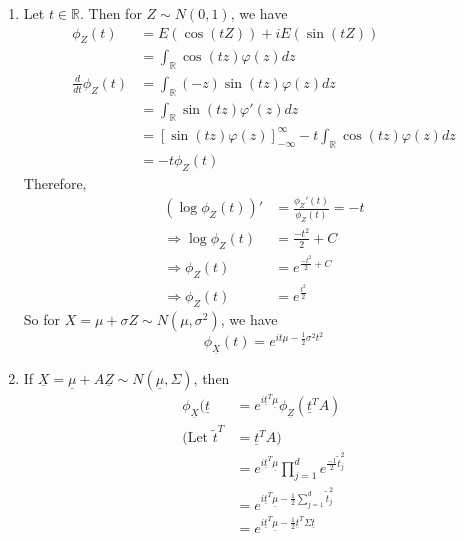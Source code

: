 \documentclass{article}
\newcommand{\R}{\mathbb{R}}
\begin{document}
			\begin{myex}{}{}
				\begin{enumerate}
					\item Let $t\in\R$. Then for $Z\sim N(0, 1)$, we have
					\begin{align*}
						\phi_{Z}(t)&=E(\cos(tZ))+iE(\sin(tZ))\\
						&=\int_{\R}\cos(tz)\varphi(z)dz\\
						\frac{d}{dt}\phi_{Z}(t)&=\int_{\R}(-z)\sin(tz)\varphi(z)dz\\
						&=\int_{\R}\sin(tz)\varphi'(z)dz\\
						&=[\sin(tz)\varphi(z)]_{-\infty}^{\infty}-t\int_{\R}\cos(tz)\varphi(z)dz\\
						&=-t\phi_{Z}(t)
					\end{align*}
					Therefore,
					\begin{align*}
						(\log\phi_{Z}(t))'&=\frac{\phi_Z'(t)}{\phi_Z(t)}=-t\\
						\Rightarrow\log\phi_Z(t)&=\frac{-t^2}{2}+C\\
						\Rightarrow\phi_Z(t)&=e^{\frac{-t^2}{2}+C}\\
						\Rightarrow\phi_Z(t)&=e^{\frac{t^2}{2}}
					\end{align*}
					So for $X=\mu+\sigma Z\sim N(\mu, \sigma^2)$, we have $$\phi_{\underline{X}}(t)=e^{it\mu-\frac{1}{2}\sigma^2t^2}$$
					
					\item If $\underline{X}=\underline{\mu}+A\underline{Z}\sim N(\underline{\mu}, \Sigma)$, then
					\begin{align*}
						\phi_{\underline{X}}(\underline{t}&=e^{i\underline{t}^T\underline{\mu}}\phi_{\underline{Z}}(\underline{t}^TA)\\
						(\mbox{Let }\tilde{t}^T&=\underline{t}^TA)\\
						&=e^{i\underline{t}^T\underline{\mu}}\prod_{j=1}^de^{\frac{-1}{2}\tilde{t}_j^2}\\
						&=e^{i\underline{t}^T\underline{\mu}-\frac{1}{2}\sum_{j=1}^d\tilde{t}_j^2}\\
						&=e^{i\underline{t}^T\underline{\mu}-\frac{1}{2}\underline{t}^T\Sigma\underline{t}}
					\end{align*}
				\end{enumerate}
			\end{myex}
			
\end{document}
